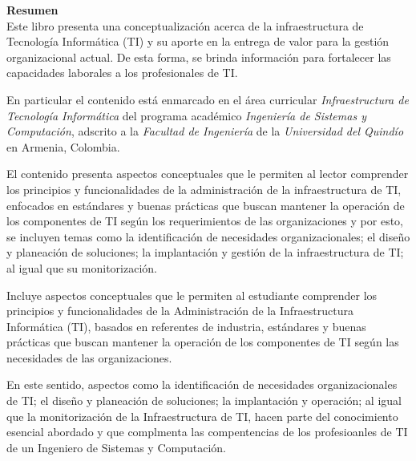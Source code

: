 \newpage
{} %
\thispagestyle{fancy}
{\huge \textbf{Resumen}}\\



Este libro presenta una conceptualización acerca de la infraestructura de Tecnología Informática (\acrshort{TI}) y su aporte en la entrega de valor para la gestión organizacional actual. De esta forma, se brinda información para fortalecer las capacidades laborales a los profesionales de TI.

En particular el contenido está enmarcado en el área curricular \textit{Infraestructura de Tecnología Informática} del programa académico \textit{Ingeniería de Sistemas y Computación}, adscrito a la \textit{Facultad de Ingeniería} de la \textit{Universidad del Quindío} en Armenia, Colombia.

El contenido presenta aspectos conceptuales que le permiten al lector comprender los principios y funcionalidades de la administración de la infraestructura de TI, enfocados en estándares y buenas prácticas que buscan mantener la operación de los componentes de TI según los requerimientos de las organizaciones y por esto, se incluyen temas como la identificación de necesidades organizacionales; el diseño y planeación de soluciones; la implantación y gestión de la infraestructura de TI; al igual que su monitorización.

Incluye aspectos conceptuales que le permiten al estudiante comprender los
principios y funcionalidades de la Administración de la Infraestructura Informática (TI), basados en referentes de industria, estándares y buenas prácticas que buscan mantener la operación de los componentes de TI según las necesidades de las
organizaciones.

En este sentido, aspectos como la identificación de necesidades
organizacionales de TI; el diseño y planeación de soluciones; la implantación y operación;
al igual que la monitorización de la Infraestructura de TI, hacen parte del conocimiento
esencial abordado y que complmenta las compentencias de los profesioanles de TI de un Ingeniero de Sistemas y Computación.








